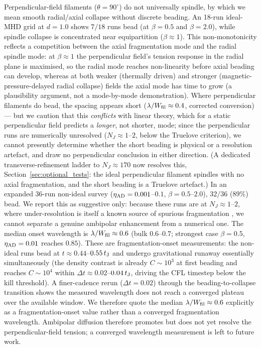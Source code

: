 \documentclass[usenatbib,twoside,twocolumn]{mnras}
\begin{document}
Perpendicular-field filaments ($\theta=90^\circ$) do not universally spindle, by which we mean smooth radial/axial collapse without discrete beading. An 18-run ideal-MHD grid at $d=1.0$ shows $7/18$ runs bead (at $\beta=0.5$ and $\beta=2.0$), while spindle collapse is concentrated near equipartition ($\beta\approx1$). This non-monotonicity reflects a competition between the axial fragmentation mode and the radial spindle mode: at $\beta\approx1$ the perpendicular field's tension response in the radial plane is maximised, so the radial mode reaches non-linearity before axial beading can develop, whereas at both weaker (thermally driven) and stronger (magnetic-pressure-delayed radial collapse) fields the axial mode has time to grow (a plausibility argument, not a mode-by-mode demonstration). Where perpendicular filaments do bead, the spacing appears short ($\lambda/W_{\rm fil}\approx0.4$, corrected conversion) --- but we caution that this \emph{conflicts} with linear theory, which for a static perpendicular field predicts a \emph{longer}, not shorter, mode; since the perpendicular runs are numerically unresolved ($N_J\approx1$--$2$, below the Truelove criterion), we cannot presently determine whether the short beading is physical or a resolution artefact, and draw no perpendicular conclusion in either direction. (A dedicated transverse-refinement ladder to $N_J\approx170$ now resolves this, Section~\ref{sec:optional_tests}: the ideal perpendicular filament spindles with no axial fragmentation, and the short beading is a Truelove artefact.) In an expanded 36-run non-ideal survey ($\eta_{\rm AD}=0.001$--$0.1$, $\beta=0.5$--$2.0$), $32/36$ ($89\%$) bead. We report this as suggestive only: because these runs are at $N_J\approx1$--$2$, where under-resolution is itself a known source of spurious fragmentation \citep{Truelove1997}, we cannot separate a genuine ambipolar enhancement from a numerical one. The median onset wavelength is $\lambda/W_{\rm fil}\approx0.6$ (bulk $0.6$--$0.7$; strongest case $\beta=0.5$, $\eta_{\rm AD}=0.01$ reaches $0.85$). These are fragmentation-onset measurements: the non-ideal runs bead at $t\approx0.44$--$0.55\,t_{\rm J}$ and undergo gravitational runaway essentially simultaneously (the density contrast is already $C\sim10^3$ at first beading and reaches $C\sim10^4$ within $\Delta t\approx0.02$--$0.04\,t_{\rm J}$, driving the CFL timestep below the kill threshold). A finer-cadence rerun ($\Delta t=0.02$) through the beading-to-collapse transition shows the measured wavelength does not reach a converged plateau over the available window. We therefore quote the median $\lambda/W_{\rm fil}\approx0.6$ explicitly as a fragmentation-onset value rather than a converged fragmentation wavelength. Ambipolar diffusion therefore promotes but does not yet resolve the perpendicular-field tension; a converged wavelength measurement is left to future work.
\end{document}
